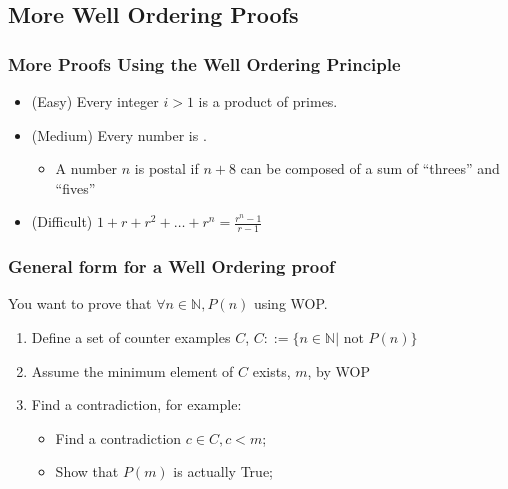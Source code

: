 \subsection{More Well Ordering Proofs}
\begin{frame}
  \frametitle{More Proofs Using the Well Ordering Principle}

  \begin{itemize}
  \item (Easy) Every integer $i > 1$ is a product of primes.

    \bigskip

  \item (Medium) Every number is .
    \begin{itemize}
    \item A number $n$ is postal if $n+8$ can be composed of a sum of
      ``threes'' and ``fives''
    \end{itemize}

    \bigskip

  \item (Difficult) $1 + r + r^2 + \ldots + r^n = \frac{r^n-1}{r-1}$
  \end{itemize}
\end{frame}

\begin{frame}
  \frametitle{General form for a Well Ordering proof}
  You want to prove that $\forall n \in \mathbb{N}, P(n)$ using WOP.

  \begin{enumerate}
  \item Define a set of counter examples $C$, $C ::=\{n \in
    \mathbb{N}|\text{ not } P(n)\}$
  \item Assume the minimum element of $C$ exists, $m$, by WOP
  \item Find a contradiction, for example:
    \begin{itemize}
    \item Find a contradiction $c \in C, c < m$;
    \item Show that $P(m)$ is actually True;
    \end{itemize}

  \end{enumerate}
\end{frame}


